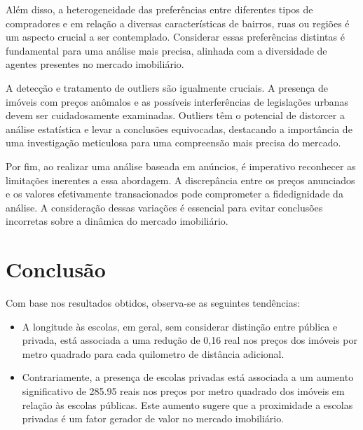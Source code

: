 Além disso, a heterogeneidade das preferências entre diferentes tipos de compradores e em relação a diversas características de bairros, ruas ou regiões é um aspecto crucial a ser contemplado. Considerar essas preferências distintas é fundamental para uma análise mais precisa, alinhada com a diversidade de agentes presentes no mercado imobiliário.

A detecção e tratamento de outliers são igualmente cruciais. A presença de imóveis com preços anômalos e as possíveis interferências de legislações urbanas devem ser cuidadosamente examinadas. Outliers têm o potencial de distorcer a análise estatística e levar a conclusões equivocadas, destacando a importância de uma investigação meticulosa para uma compreensão mais precisa do mercado.

Por fim, ao realizar uma análise baseada em anúncios, é imperativo reconhecer as limitações inerentes a essa abordagem. A discrepância entre os preços anunciados e os valores efetivamente transacionados pode comprometer a fidedignidade da análise. A consideração dessas variações é essencial para evitar conclusões incorretas sobre a dinâmica do mercado imobiliário.


\section{Conclusão}

Com base nos resultados obtidos, observa-se as seguintes tendências:
\vspace{0.2em}

   \begin{itemize}
      \item A longitude às escolas, em geral, sem considerar distinção entre pública e privada, está associada a uma redução de 0,16 real nos preços dos imóveis por metro quadrado para cada quilometro de distância adicional.
     \item Contrariamente, a presença de escolas privadas está associada a um aumento significativo de 285.95 reais nos preços por metro quadrado dos imóveis em relação às escolas públicas. Este aumento sugere que a proximidade a escolas privadas é um fator gerador de valor no mercado imobiliário.

   \end{itemize}
   
